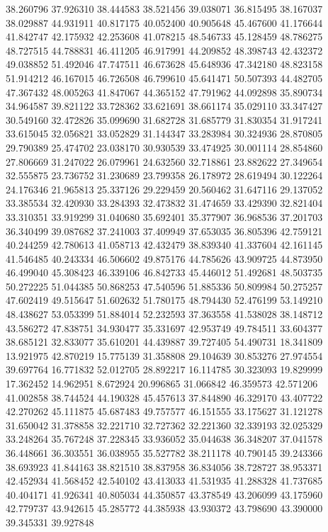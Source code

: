 38.260796
37.926310
38.444583
38.521456
39.038071
36.815495
38.167037
38.029887
44.931911
40.817175
40.052400
40.905648
45.467600
41.176644
41.842747
42.175932
42.253608
41.078215
48.546733
45.128459
48.786275
48.727515
44.788831
46.411205
46.917991
44.209852
48.398743
42.432372
49.038852
51.492046
47.747511
46.673628
45.648936
47.342180
48.823158
51.914212
46.167015
46.726508
46.799610
45.641471
50.507393
44.482705
47.367432
48.005263
41.847067
44.365152
47.791962
44.092898
35.890734
34.964587
39.821122
33.728362
33.621691
38.661174
35.029110
33.347427
30.549160
32.472826
35.099690
31.682728
31.685779
31.830354
31.917241
33.615045
32.056821
33.052829
31.144347
33.283984
30.324936
28.870805
29.790389
25.474702
23.038170
30.930539
33.474925
30.001114
28.854860
27.806669
31.247022
26.079961
24.632560
32.718861
23.882622
27.349654
32.555875
23.736752
31.230689
23.799358
26.178972
28.619494
30.122264
24.176346
21.965813
25.337126
29.229459
20.560462
31.647116
29.137052
33.385534
32.420930
33.284393
32.473832
31.474659
33.429390
32.821404
33.310351
33.919299
31.040680
35.692401
35.377907
36.968536
37.201703
36.340499
39.087682
37.241003
37.409949
37.653035
36.805396
42.759121
40.244259
42.780613
41.058713
42.432479
38.839340
41.337604
42.161145
41.546485
40.243334
46.506602
49.875176
44.785626
43.909725
44.873950
46.499040
45.308423
46.339106
46.842733
45.446012
51.492681
48.503735
50.272225
51.044385
50.868253
47.540596
51.885336
50.809984
50.275257
47.602419
49.515647
51.602632
51.780175
48.794430
52.476199
53.149210
48.438627
53.053399
51.884014
52.232593
37.363558
41.538028
38.148712
43.586272
47.838751
34.930477
35.331697
42.953749
49.784511
33.604377
38.685121
32.833077
35.610201
44.439887
39.727405
54.490731
18.341809
13.921975
42.870219
15.775139
31.358808
29.104639
30.853276
27.974554
39.697764
16.771832
52.012705
28.892217
16.114785
30.323093
19.829999
17.362452
14.962951
8.672924
20.996865
31.066842
46.359573
42.571206
41.002858
38.744524
44.190328
45.457613
37.844890
46.329170
43.407722
42.270262
45.111875
45.687483
49.757577
46.151555
33.175627
31.121278
31.650042
31.378858
32.221710
32.727362
32.221360
32.339193
32.025329
33.248264
35.767248
37.228345
33.936052
35.044638
36.348207
37.041578
36.448661
36.303551
36.038955
35.527782
38.211178
40.790145
39.243366
38.693923
41.844163
38.821510
38.837958
36.834056
38.728727
38.953371
42.452934
41.568452
42.540102
43.413033
41.531935
41.288328
41.737685
40.404171
41.926341
40.805034
44.350857
43.378549
43.206099
43.175960
42.779737
43.942615
45.285772
44.385938
43.930372
43.798690
43.390000
39.345331
39.927848
